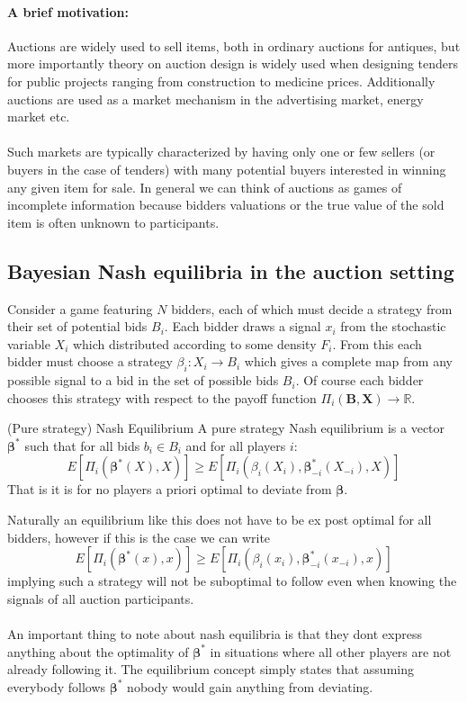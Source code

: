 \paragraph{A brief motivation:} Auctions are widely used to sell items, both in ordinary auctions for antiques, but more importantly theory on auction design is widely used when designing tenders for public projects ranging from construction to medicine prices. Additionally auctions are used as a market mechanism in the advertising market, energy market etc.
\\ \\
Such markets are typically characterized by having only one or few sellers (or buyers in the case of tenders) with many potential buyers interested in winning any given item for sale. In general we can think of auctions as games of incomplete information because bidders valuations or the true value of the sold item is often unknown to participants.

\subsection{Bayesian Nash equilibria in the auction setting}
Consider a game featuring $N$ bidders, each of which must decide a strategy from their set of potential bids $B_i$. Each bidder draws a signal $x_i$ from the stochastic variable $X_i$ which distributed according to some density $F_i$. From this each bidder must choose a strategy $\beta_i: X_i \rightarrow B_i$ which gives a complete map from any possible signal to a bid in the set of possible bids $B_i$. Of course each bidder chooses this strategy with respect to the payoff function $\Pi_i(\bm B, \bm X) \rightarrow \mathbb{R}$.


\begin{definition}{(Pure strategy) Nash Equilibrium}
  A pure strategy Nash equilibrium is a vector $\bm\beta^*$ such that for all bids $b_i \in B_i$ and for all players $i$:
  \begin{equation}
    E[\Pi_i(\bm\beta^*(X), X)] \geq E[\Pi_i(\beta_i(X_i), \bm\beta^*_{-i}(X_{-i}),X )]
  \end{equation}
  That is it is for no players a priori optimal to deviate from $\bm\beta$.
\end{definition}

Naturally an equilibrium like this does not have to be ex post optimal for all bidders, however if this is the case we can write
\begin{equation}
      E[\Pi_i(\bm\beta^*(x), x)] \geq E[\Pi_i(\beta_i(x_i), \bm\beta^*_{-i}(x_{-i}),x )]
\end{equation}
implying such a strategy will not be suboptimal to follow even when knowing the signals of all auction participants.
\\ \\
An important thing to note about nash equilibria is that they dont express anything about the optimality of $\bm\beta^*$ in situations where all other players are not already following it. The equilibrium concept simply states that assuming everybody follows $\bm\beta^*$ nobody would gain anything from deviating.


